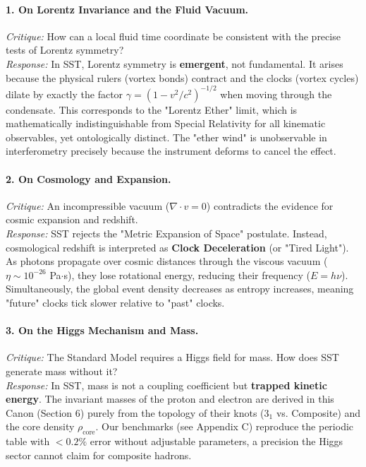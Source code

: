 \documentclass[10pt]{article}
\newcommand{\rhocore}{\rho_{\text{core}}}
\begin{document}
\paragraph{1. On Lorentz Invariance and the Fluid Vacuum.}
\textit{Critique:} How can a local fluid time coordinate be consistent with the precise tests of Lorentz symmetry? \\
\textit{Response:} In SST, Lorentz symmetry is \textbf{emergent}, not fundamental. It arises because the physical rulers (vortex bonds) contract and the clocks (vortex cycles) dilate by exactly the factor $\gamma = (1-v^2/c^2)^{-1/2}$ when moving through the condensate. This corresponds to the "Lorentz Ether" limit, which is mathematically indistinguishable from Special Relativity for all kinematic observables, yet ontologically distinct. The "ether wind" is unobservable in interferometry precisely because the instrument deforms to cancel the effect.

\paragraph{2. On Cosmology and Expansion.}
\textit{Critique:} An incompressible vacuum ($\nabla \cdot v = 0$) contradicts the evidence for cosmic expansion and redshift. \\
\textit{Response:} SST rejects the "Metric Expansion of Space" postulate. Instead, cosmological redshift is interpreted as \textbf{Clock Deceleration} (or "Tired Light"). As photons propagate over cosmic distances through the viscous vacuum ($\eta \sim 10^{-26}$ Pa$\cdot$s), they lose rotational energy, reducing their frequency ($E=h\nu$). Simultaneously, the global event density decreases as entropy increases, meaning "future" clocks tick slower relative to "past" clocks.

\paragraph{3. On the Higgs Mechanism and Mass.}
\textit{Critique:} The Standard Model requires a Higgs field for mass. How does SST generate mass without it? \\
\textit{Response:} In SST, mass is not a coupling coefficient but \textbf{trapped kinetic energy}. The invariant masses of the proton and electron are derived in this Canon (Section 6) purely from the topology of their knots ($3_1$ vs. Composite) and the core density $\rhocore$. Our benchmarks (see Appendix C) reproduce the periodic table with $<0.2\%$ error without adjustable parameters, a precision the Higgs sector cannot claim for composite hadrons.
\end{document}
